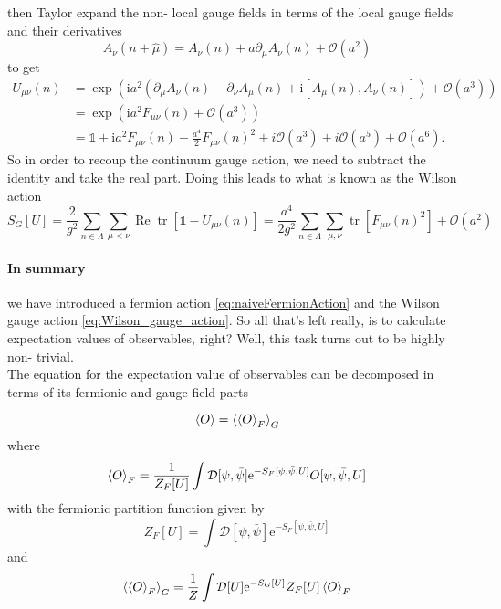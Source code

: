 \documentclass[a4paper,10pt]{book}
\begin{document}
then Taylor expand the non- local gauge fields in terms of the local gauge fields and their derivatives 
\begin{equation}
A_{\nu}(n+\hat{\mu})=A_{\nu}(n)+a \partial_{\mu} A_{\nu}(n)+\mathcal{O}\left(a^{2}\right)
\end{equation}
to get
\begin{equation}
\begin{aligned}
U_{\mu \nu}(n) &=\exp \left(\mathrm{i} a^{2}\left(\partial_{\mu} A_{\nu}(n)-\partial_{\nu} A_{\mu}(n)+\mathrm{i}\left[A_{\mu}(n), A_{\nu}(n)\right]\right)+\mathcal{O}\left(a^{3}\right)\right) \\
&=\exp \left(\mathrm{i} a^{2} F_{\mu \nu}(n)+\mathcal{O}\left(a^{3}\right)\right)\\
&=\mathbb{1} + \mathrm{i} a^{2} F_{\mu \nu}(n) - \frac{a^4}{2}F_{\mu \nu}(n)^2+i\mathcal{O}\left(a^{3}\right)+i\mathcal{O}\left(a^{5}\right)+\mathcal{O}\left(a^{6}\right).
\end{aligned}
\end{equation}
So in order to recoup the continuum gauge action, we need to subtract the identity and take the real part. Doing this leads to what is known as the Wilson action
\begin{equation}\label{eq:Wilson_gauge_action}
S_{G}[U]=\frac{2}{g^{2}} \sum_{n \in \Lambda} \sum_{\mu<\nu} \operatorname{Re} \operatorname{tr}\left[\mathbb{1}-U_{\mu \nu}(n)\right]=\frac{a^{4}}{2 g^{2}} \sum_{n \in \Lambda} \sum_{\mu, \nu} \operatorname{tr}\left[F_{\mu \nu}(n)^{2}\right]+\mathcal{O}\left(a^{2}\right)
\end{equation}
\paragraph{In summary} we have introduced a fermion action \eqref{eq:naiveFermionAction} and the Wilson gauge action \eqref{eq:Wilson_gauge_action}. So all that's left really, is to calculate expectation values of observables, right? Well, this task turns out to be highly non- trivial.\\The equation for the expectation value of observables can be decomposed in terms of its fermionic and gauge field parts

\begin{equation}
\braket{O} = \braket{\braket{O}_F}_G
\end{equation}
where
\begin{equation}\label{eq:fermionic_expectationValue}
\braket{O}_{F}=\frac{1}{Z_{F}[U]} \int \mathcal{D}[\psi, \bar{\psi}] \mathrm{e}^{-S_{F}[\psi, \bar{\psi}, U]} O[\psi, \bar{\psi}, U]
\end{equation}
with the fermionic partition function given by
\begin{equation}
Z_{F}[U]=\int \mathcal{D}[\psi, \bar{\psi}] \mathrm{e}^{-S_{F}[\psi, \bar{\psi}, U]}
\end{equation}
and
\begin{equation}\label{eq:gluonic_On_fermionic_E_val}
\braket{\braket{O}_{F}}_G=\frac{1}{Z} \int \mathcal{D}[U] \mathrm{e}^{-S_{G}[U]} Z_{F}[U] \braket{O}_{F}
\end{equation}
\end{document}
